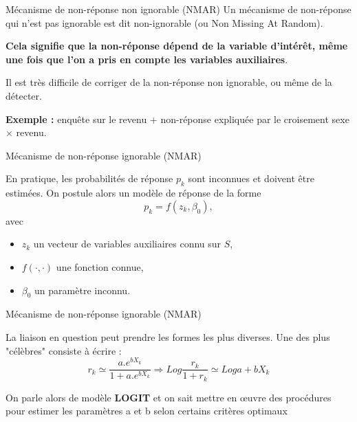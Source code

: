 \begin{frame}{Mécanisme de non-réponse non ignorable (NMAR)}
Un mécanisme de non-réponse qui n’est pas ignorable est dit non-ignorable (ou Non Missing At Random). \vspace{0.3cm}

\textbf{Cela signifie que la non-réponse dépend de la variable d’intérêt, même une fois que l’on a pris en compte les variables auxiliaires}. \\ \vspace{0.5cm}

Il est très difficile de corriger de la non-réponse non ignorable, ou même de la détecter.\\ \vspace{0.5cm}

\textbf{Exemple :} enquête sur le revenu + non-réponse expliquée par le croisement sexe $\times$ revenu.

\end{frame}



\begin{frame}{Mécanisme de non-réponse ignorable (NMAR)}
	
En pratique, les probabilités de réponse $p_k$ sont inconnues et doivent être estimées. On postule alors un modèle de réponse de la forme 
\[
p_k = f(z_k, \beta_0),
\]
avec 
\begin{itemize}
	\item $z_k$ un vecteur de variables auxiliaires connu sur $S$,
	\item $f(\cdot, \cdot)$ une fonction connue,
	\item $\beta_0$ un paramètre inconnu.
\end{itemize}


\end{frame}

\begin{frame}{Mécanisme de non-réponse ignorable (NMAR)}
	
La liaison en question peut prendre les formes les plus diverses. Une des plus "célèbres" consiste à écrire :\\ 

$$r_k \simeq \frac{a.e^{bX_k}}{1+ a.e^{bX_k}} \Rightarrow Log \frac{r_k}{1+r_k} \simeq Log a + bX_k $$



On parle alors de modèle \textbf{LOGIT} et on sait mettre en œuvre
des procédures pour estimer les paramètres a et b selon certains critères optimaux

\end{frame}

